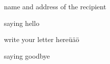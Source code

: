 \documentclass[10pt,a4paper]{letter}
\begin{document}
 
\begin{letter}{name and address of the recipient} 
\opening{saying hello} 
 
write your letter hereüäö 
 
\closing{saying goodbye} 
\end{letter} 
\end{document}
